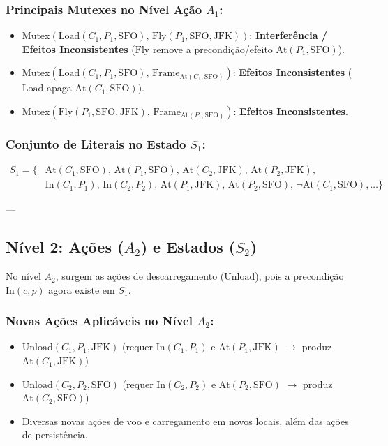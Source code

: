 \documentclass[a4paper,12pt]{article}
\begin{document}
\subsubsection*{Principais Mutexes no Nível Ação $A_1$:}
\begin{itemize}
	\item $\text{Mutex}(\text{Load}(C_1, P_1, \text{SFO}), \, \text{Fly}(P_1, \text{SFO}, \text{JFK}))$: \textbf{Interferência / Efeitos Inconsistentes} ($\text{Fly}$ remove a precondição/efeito $\text{At}(P_1, \text{SFO})$).
	\item $\text{Mutex}(\text{Load}(C_1, P_1, \text{SFO}), \, \text{Frame}_{\text{At}(C_1, \text{SFO})})$: \textbf{Efeitos Inconsistentes} ($\text{Load}$ apaga $\text{At}(C_1, \text{SFO})$).
	\item $\text{Mutex}(\text{Fly}(P_1, \text{SFO}, \text{JFK}), \, \text{Frame}_{\text{At}(P_1, \text{SFO})})$: \textbf{Efeitos Inconsistentes}.
\end{itemize}

\subsubsection*{Conjunto de Literais no Estado $S_1$:}
\begin{align*}
	S_1 = \{ & \text{At}(C_1, \text{SFO}), \, \text{At}(P_1, \text{SFO}), \, \text{At}(C_2, \text{JFK}), \, \text{At}(P_2, \text{JFK}), \\
	& \text{In}(C_1, P_1), \, \text{In}(C_2, P_2), \, \text{At}(P_1, \text{JFK}), \, \text{At}(P_2, \text{SFO}), \, \neg \text{At}(C_1, \text{SFO}), \dots \}
\end{align*}

---

\subsection*{Nível 2: Ações ($A_2$) e Estados ($S_2$)}

No nível $A_2$, surgem as ações de descarregamento ($\text{Unload}$), pois a precondição $\text{In}(c, p)$ agora existe em $S_1$.

\subsubsection*{Novas Ações Aplicáveis no Nível $A_2$:}
\begin{itemize}
	\item $\text{Unload}(C_1, P_1, \text{JFK})$ (requer $\text{In}(C_1, P_1)$ e $\text{At}(P_1, \text{JFK})$ $\to$ produz $\text{At}(C_1, \text{JFK})$)
	\item $\text{Unload}(C_2, P_2, \text{SFO})$ (requer $\text{In}(C_2, P_2)$ e $\text{At}(P_2, \text{SFO})$ $\to$ produz $\text{At}(C_2, \text{SFO})$)
	\item Diversas novas ações de voo e carregamento em novos locais, além das ações de persistência.
\end{itemize}
\end{document}
